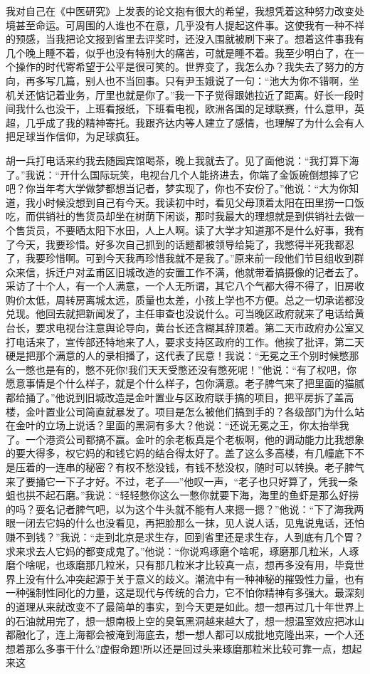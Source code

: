 \documentclass[12pt,oneside]{book}
\begin{document}
我对自己在《中医研究》上发表的论文抱有很大的希望，我想凭着这种努力改变处境甚至命运。可周围的人谁也不在意，几乎没有人提起这件事。这使我有一种不祥的预感，当我把论文报到省里去评奖时，还没入围就被刷下来了。想着这件事我有几个晚上睡不着，似乎也没有特别大的痛苦，可就是睡不着。我至少明白了，在一个操作的时代寄希望于公平是很可笑的。世界变了，我怎么办？我失去了努力的方向，再多写几篇，别人也不当回事。只有尹玉娥说了一句：``池大为你不错啊，坐机关还惦记着业务，厅里也就是你了。''我一下子觉得跟她拉近了距离。好长一段时间我什么也没干，上班看报纸，下班看电视，欧洲各国的足球联赛，什么意甲，英超，几乎成了我的精神寄托。我跟齐达内等人建立了感情，也理解了为什么会有人把足球当作信仰，为足球疯狂。

胡一兵打电话来约我去随园宾馆喝茶，晚上我就去了。见了面他说：``我打算下海了。''我说：``开什么国际玩笑，电视台几个人能挤进去，你端了金饭碗倒想摔了它吧？你当年考大学做梦都想当记者，梦实现了，你也不安份了。''他说：``大为你知道，我小时候没想到自己有今天。我读初中时，看见父母顶着太阳在田里捞一口饭吃，而供销社的售货员却坐在树荫下闲谈，那时我最大的理想就是到供销社去做一个售货员，不要晒太阳下水田，人上人啊。读了大学才知道那不是什么好事，我有了今天，我要珍惜。好多次自己抓到的话题都被领导给毙了，我憋得半死我都忍了，我要珍惜啊。可到今天我再珍惜我就不是我了。''原来前一段他们节目组收到群众来信，拆迁户对孟甫区旧城改造的安置工作不满，他就带着搞摄像的记者去了。采访了十个人，有一个人满意，一个人无所谓，其它八个气都大得不得了，旧房收购价太低，周转房离城太远，质量也太差，小孩上学也不方便。总之一切承诺都没兑现。他回去就把新闻发了，主任审查也没说什么。可当晚区政府就来了电话给黄台长，要求电视台注意舆论导向，黄台长还含糊其辞顶着。第二天市政府办公室又打电话来了，宣传部还特地来了人，要求支持区政府的工作。他挨了批评，第二天硬是把那个满意的人的录相播了，这代表了民意！我说：``无冕之王个别时候憋那么一憋也是有的，憋不死你!我们天天受憋还没有憋死呢！''他说：``有了权吧，你愿意事情是个什么样子，就是个什么样子，包你满意。老子脾气来了把里面的猫腻都给捅了。''他说到旧城改造是金叶置业与区政府联手搞的项目，把平房拆了盖高楼，金叶置业公司简直就暴发了。项目是怎么被他们搞到手的？各级部门为什么站在金叶的立场上说话？里面的黑洞有多大？他说：``还说无冕之王，你太抬举我了。一个港资公司都搞不赢。金叶的余老板真是个老板啊，他的调动能力比我想象的要大得多，权它妈的和钱它妈的结合得太好了。盖了这么多高楼，有几幢底下不是压着的一连串的秘密？有权不愁没钱，有钱不愁没权，随时可以转换。老子脾气来了要捅它一下子才好。不过，老子──''他叹一声，``老子也只好算了，凭我一条蛆也拱不起石磨。''我说：``轻轻憋你这么一憋你就要下海，海里的鱼虾是那么好捞的吗？耍名记者脾气吧，以为这个牛头就不能有人来摁一摁？''他说：``下了海我两眼一闭去它妈的什么也没看见，再把脸那么一抹，见人说人话，见鬼说鬼话，还怕赚不到钱？''我说：``走到北京是求生存，回到省里还是求生存，人到底有几个胃？求来求去人它妈的都变成鬼了。''他说：``你说鸡琢磨个啥呢，琢磨那几粒米，人琢磨个啥呢，也琢磨那几粒米，只有那几粒米才比较真一点，想再多没有用，毕竟世界上没有什么冲突起源于关于意义的歧义。潮流中有一种神秘的摧毁性力量，也有一种强制性同化的力量，这是现代与传统的合力，它不怕你精神有多强大。最深刻的道理从来就改变不了最简单的事实，到今天更是如此。想一想再过几十年世界上的石油就用完了，想一想南极上空的臭氧黑洞越来越大了，想一想温室效应把冰山都融化了，连上海都会被淹到海底去，想一想人都可以成批地克隆出来，一个人还想着那么多事干什么?虚假命题!所以还是回过头来琢磨那粒米比较可靠一点，想起来这
\end{document}
